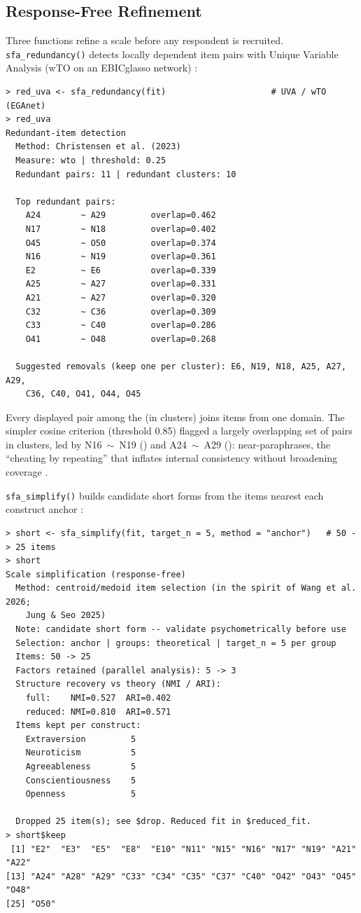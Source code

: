 \subsection{Response-Free Refinement}

Three functions refine a scale before any respondent is recruited.
\texttt{sfa\_redundancy()} detects locally dependent item pairs with
Unique Variable Analysis (wTO on an EBICglasso
network) \citep{christensen-etal-2023}:

{\scriptsize
\begin{verbatim}
> red_uva <- sfa_redundancy(fit)                     # UVA / wTO (EGAnet)
> red_uva
Redundant-item detection
  Method: Christensen et al. (2023)
  Measure: wto | threshold: 0.25
  Redundant pairs: 11 | redundant clusters: 10

  Top redundant pairs:
    A24        ~ A29         overlap=0.462
    N17        ~ N18         overlap=0.402
    O45        ~ O50         overlap=0.374
    N16        ~ N19         overlap=0.361
    E2         ~ E6          overlap=0.339
    A25        ~ A27         overlap=0.331
    A21        ~ A27         overlap=0.320
    C32        ~ C36         overlap=0.309
    C33        ~ C40         overlap=0.286
    O41        ~ O48         overlap=0.268

  Suggested removals (keep one per cluster): E6, N19, N18, A25, A27, A29,
    C36, C40, O41, O44, O45
\end{verbatim}
}

Every displayed pair among the \valUvaPairsWord{} (in \valUvaClustersWord{} clusters) joins items from
one domain. The simpler cosine criterion (threshold 0.85) flagged a
largely overlapping set of \valCosPairsWord{} pairs in \valCosClustersWord{} clusters, led by
N16~$\sim$~N19 (\valCosTopA) and A24~$\sim$~A29 (\valCosTopB): near-paraphrases, the
``cheating by repeating'' that inflates internal consistency without
broadening coverage \citep{christensen-etal-2023}.

\texttt{sfa\_simplify()} builds candidate short forms from the items
nearest each construct anchor \citep{jung-seo-2025, wang-etal-2026}:

{\scriptsize
\begin{verbatim}
> short <- sfa_simplify(fit, target_n = 5, method = "anchor")   # 50 -> 25 items
> short
Scale simplification (response-free)
  Method: centroid/medoid item selection (in the spirit of Wang et al. 2026;
    Jung & Seo 2025)
  Note: candidate short form -- validate psychometrically before use
  Selection: anchor | groups: theoretical | target_n = 5 per group
  Items: 50 -> 25
  Factors retained (parallel analysis): 5 -> 3
  Structure recovery vs theory (NMI / ARI):
    full:    NMI=0.527  ARI=0.402
    reduced: NMI=0.810  ARI=0.571
  Items kept per construct:
    Extraversion         5
    Neuroticism          5
    Agreeableness        5
    Conscientiousness    5
    Openness             5

  Dropped 25 item(s); see $drop. Reduced fit in $reduced_fit.
> short$keep
 [1] "E2"  "E3"  "E5"  "E8"  "E10" "N11" "N15" "N16" "N17" "N19" "A21" "A22"
[13] "A24" "A28" "A29" "C33" "C34" "C35" "C37" "C40" "O42" "O43" "O45" "O48"
[25] "O50"
\end{verbatim}
}

